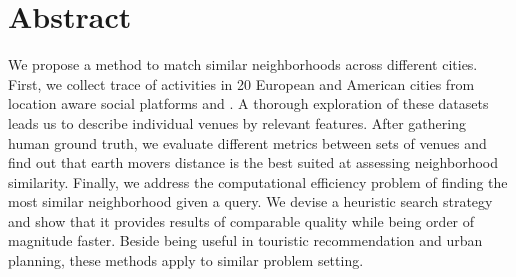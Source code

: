 \begingroup
\let\clearpage\relax

\chapter*{Abstract}

We propose a method to match similar neighborhoods across different cities.
First, we collect trace of activities in 20 European and American cities from
location aware social platforms \fs{} and \flickr{}. A thorough exploration
of these datasets leads us to describe individual venues by relevant features.
After gathering human ground truth, we evaluate different metrics between sets
of venues and find out that earth movers distance is the best suited at
assessing neighborhood similarity. Finally, we address the computational
efficiency problem of finding the most similar neighborhood given a query. We
devise a heuristic search strategy and show that it provides results of
comparable quality while being order of magnitude faster. Beside being useful
in touristic recommendation and urban planning, these methods apply to similar
problem setting.

\endgroup 
\vfill
